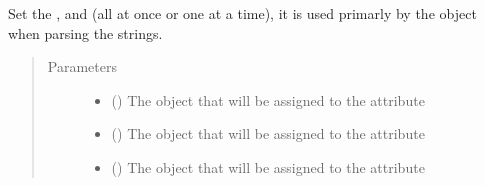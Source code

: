 \documentclass[letterpaper,10pt,english]{sphinxmanual}
\begin{document}
\begin{fulllineitems}
\begin{fulllineitems}
\begin{quote}
\begin{description}
\end{description}\end{quote}

\end{fulllineitems}


\begin{fulllineitems}
\label{\detokenize{model:simple_sql.model.foreign_key.ForeignKey.set_objects}}
\sphinxAtStartPar
Set the ,  and  (all at once or one at a time),
it is used primarly by the  object when parsing the strings.
\begin{quote}\begin{description}
\item[{Parameters}] \leavevmode\begin{itemize}
\item {} 
\sphinxAtStartPar
{} ({\hyperref[\detokenize{model:simple_sql.model.column.Column}]{}}\sphinxstyleliteralemphasis{\sphinxupquote{, }}) \textendash{} The object that will be assigned to the  attribute

\item {} 
\sphinxAtStartPar
{} ({\hyperref[\detokenize{model:simple_sql.model.table.Table}]{}}\sphinxstyleliteralemphasis{\sphinxupquote{, }}) \textendash{} The object that will be assigned to the  attribute

\item {} 
\sphinxAtStartPar
{} ({\hyperref[\detokenize{model:simple_sql.model.column.Column}]{}}\sphinxstyleliteralemphasis{\sphinxupquote{, }}) \textendash{} The object that will be assigned to the  attribute


\end{itemize}
\end{description}
\end{quote}
\end{fulllineitems}
\end{fulllineitems}
\end{document}
